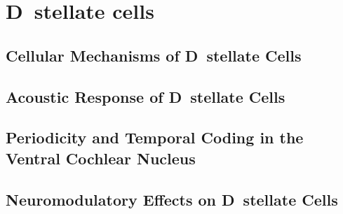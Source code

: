 \section{D~stellate cells}


\subsection{Cellular Mechanisms of D~stellate Cells}






\subsection{Acoustic Response of D~stellate  Cells}







\subsection{Periodicity and Temporal Coding in the Ventral Cochlear Nucleus}






\subsection{Neuromodulatory Effects on D~stellate Cells}



